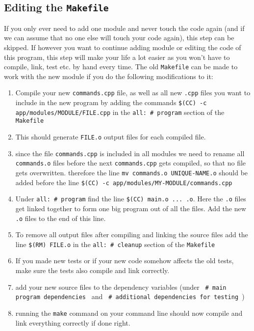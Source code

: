 \documentclass{article}
\begin{document}
\subsection{Editing the \texttt{Makefile}}
If you only ever need to add one module and never touch the code again (and if 
we can assume that no one else will touch your code again), this step can be 
skipped. If however you want to continue adding module or editing the code of 
this program, this step will make your life a lot easier as you won't have to 
compile, link, test etc. by hand every time. The old \texttt{Makefile} can be 
made to work with the new module if you do the following modifications to it:
\begin{enumerate}
	\item 	Compile your new \texttt{commands.cpp} file, as well as all 
		new \texttt{.cpp} files you want to include in the new program
		by adding the commands 
		\texttt{\$(CC) -c app/modules/MODULE/FILE.cpp} in the 
		\texttt{all: \# program} section of the \texttt{Makefile}
	\item	This should generate \texttt{FILE.o} output files for each 
		compiled file.
	\item	since the file \texttt{commands.cpp} is included in all 
		modules we need to rename all \texttt{commands.o} files before 
		the next \texttt{commands.cpp} gets compiled, so that no file 
		gets overwritten. therefore the line 
		\texttt{mv commands.o UNIQUE-NAME.o} should be added before 
		the line \texttt{\$(CC) -c app/modules/MY-MODULE/commands.cpp}
	\item	Under \texttt{all: \# program} find the line 
		\texttt{\$(CC) main.o ... .o}. Here the \texttt{.o} files get 
		linked together to form one big program out of all the files. 
		Add the new \texttt{.o} files to the end of this line.
	\item	To remove all output files after compiling and linking the 
		source files add the line \texttt{\$(RM) FILE.o} in the 
		\texttt{all: \# cleanup} section of the \texttt{Makefile}
	\item	If you made new tests or if your new code somehow affects the 
		old tests, make sure the tests also compile and link correctly.
	\item	add your new source files to the dependency variables (under 
		\texttt{ \# main program dependencies } and 
		\texttt{ \# additional dependencies for testing }) 
	\item	running the \texttt{make} command on your command line should 
		now compile and link everything correctly if done right.
\end{enumerate}
\end{document}
